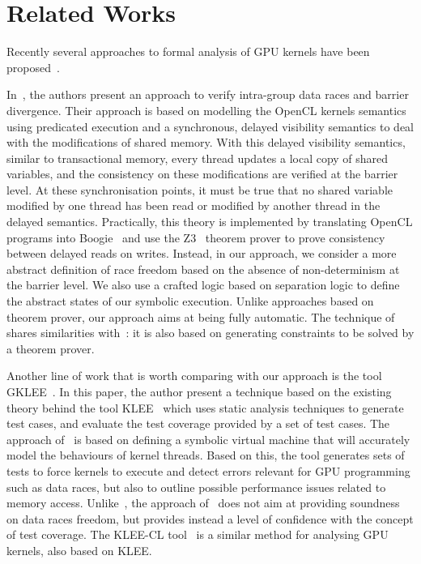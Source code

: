\documentclass[a4paper,11pt]{llncs}
\begin{document}
\section{Related Works}
\label{sec:related-work}

Recently several approaches to formal analysis of GPU kernels have
been
proposed~\cite{PUG,BettsCDQT_OOPSLA2012,CollingbourneDKQ_ESOP2013,DBLP:conf/ppopp/LiLSGGR12,KLEECL,PLDI2012,BYTECODE}.

In~\cite{BettsCDQT_OOPSLA2012}, the authors present an approach to verify intra-group data races and barrier divergence. Their approach is based on modelling the OpenCL kernels semantics using predicated execution and a synchronous, delayed visibility semantics to deal with the modifications of shared memory. With this delayed visibility semantics, similar to transactional memory, every thread updates a local copy of shared variables, and the consistency on these modifications are verified at the barrier level. At these synchronisation points, it must be true that no shared variable modified by one thread has been read or modified by another thread in the delayed semantics. Practically, this theory is implemented by translating OpenCL programs into Boogie~\cite{Boogie} and use the Z3~\cite{Z3} theorem prover to prove consistency between delayed reads on writes. Instead, in our approach, we consider a more abstract definition of race freedom based on the absence of non-determinism at the barrier level. We also use a crafted logic based on separation logic to define the abstract states of our symbolic execution. Unlike approaches based on theorem prover, our approach aims at being fully automatic.  The technique of~\cite{PUG} shares similarities with~\cite{BettsCDQT_OOPSLA2012}: it is also based on generating constraints to be solved by a theorem prover.


Another line of work that is worth comparing with our approach is the tool GKLEE~\cite{DBLP:conf/ppopp/LiLSGGR12}.
In this paper, the author present a technique based on the existing theory behind the tool KLEE~\cite{klee} which uses static analysis techniques to generate test cases, and evaluate the test coverage provided by a set of test cases.
The approach of~\cite{DBLP:conf/ppopp/LiLSGGR12} is based on defining a symbolic virtual machine that will accurately model the behaviours of kernel threads. Based on this, the tool generates sets of tests to force kernels to execute and detect errors relevant for GPU programming such as data races, but also to outline possible performance issues related to memory access. Unlike~\cite{BettsCDQT_OOPSLA2012}, the approach of~\cite{DBLP:conf/ppopp/LiLSGGR12} does not aim at providing soundness on data races freedom, but provides instead a level of confidence with the concept of test coverage.  The KLEE-CL tool~\cite{KLEECL} is a similar method for analysing GPU kernels, also based on KLEE.
\end{document}
